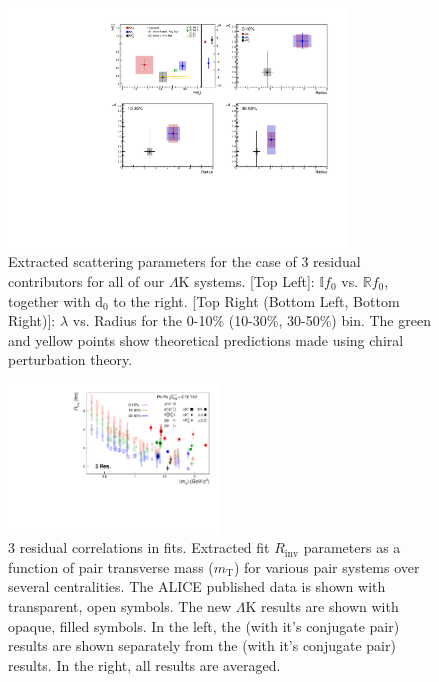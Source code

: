 \documentclass[../AnalysisNoteJBuxton.tex]{subfiles}
\begin{document}
\begin{figure}[h]
  \centering
  \includegraphics[width=0.80\textwidth]{7_ResultsAndDiscussion/Figures/CompareAllScattParams_Comp3An_3Res.pdf}
  \caption[Extracted Scattering Parameters: 3 Residuals in Fit]{Extracted scattering parameters for the case of 3 residual contributors for all of our $\Lambda$K systems.  [Top Left]: $\mathbb{I}f_{0}$ vs. $\mathbb{R}f_{0}$, together with d$_{0}$ to the right.  [Top Right (Bottom Left, Bottom Right)]: $\lambda$ vs. Radius for the 0-10\% (10-30\%, 30-50\%) bin.  The green \cite{Liu:2006xja} and yellow \cite{Mai:2009ce} points show theoretical predictions made using chiral perturbation theory.}
  \label{fig:ScattParams_3Res}
\end{figure}


\begin{figure}[h]
  \centering
  \includegraphics[width=0.5\textwidth]{7_ResultsAndDiscussion/Figures/mTscaling_MinvCalc_OutlinedPoints_OthersTransparent_wJaiAndHans_3Res.pdf}
  \caption[$m_{\mathrm{T}}$ Scaling of Radii: 3 Residuals in Fit]{3 residual correlations in \LamK fits.  Extracted fit $R_{\mathrm{inv}}$ parameters as a function of pair transverse mass ($m_{\mathrm{T}}$) for various pair systems over several centralities. The ALICE published data \cite{Adam:2015vja} is shown with transparent, open symbols.  The new $\Lambda$K results are shown with opaque, filled symbols.  In the left, the \LamKchP (with it's conjugate pair) results are shown separately from the \LamKchM (with it's conjugate pair) results.  In the right, all \LamKpm results are averaged.}
  \label{fig:mTScalingOfRadii_3Res}
\end{figure}

\clearpage
\end{document}
